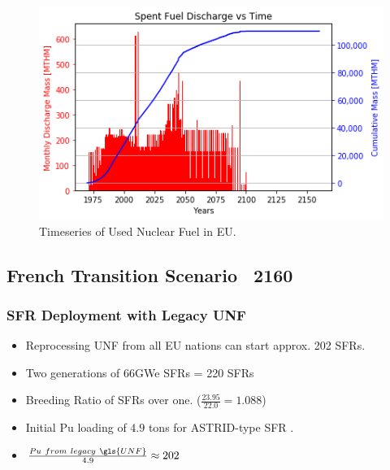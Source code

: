 \begin{frame}

\begin{figure}[htbp!]
	\begin{center}
			\includegraphics[scale=0.7]{./images/eu_future/snf_discharge.png}
	\end{center}
	\caption{Timeseries of Used Nuclear Fuel in \gls{EU}.}
	\label{fig:eu_snf}
\end{figure}

\end{frame}

\subsection{French Transition Scenario ~2160}

\begin{frame}
	\frametitle{SFR Deployment with Legacy UNF}
	\begin{itemize}
		\item Reprocessing UNF from all EU nations can start approx. 202 SFRs.
		\item Two generations of 66GWe SFRs = 220 SFRs
		\item Breeding Ratio of SFRs over one. ($\frac{23.95}{22.0} = 1.088$)
		\item Initial Pu loading of $4.9$ tons for ASTRID-type SFR \cite{varaine_pre-conceptual_2012}.
		\item $\frac{Pu \ from \ legacy \ \gls{UNF}}{4.9} \approx 202$
	\end{itemize}
\end{frame}

